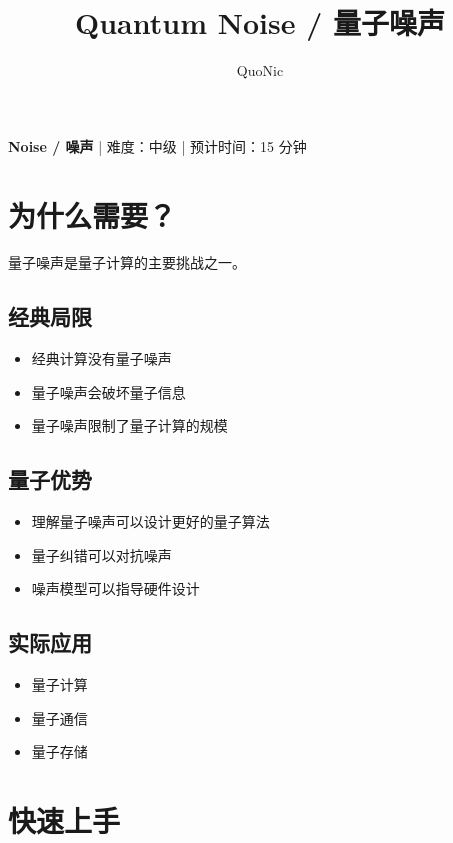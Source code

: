 \documentclass[12pt,a4paper]{article}
\title{Quantum Noise / 量子噪声}
\author{QuoNic}
\date{}
\begin{document}
\maketitle

\begin{center}
\textbf{Noise / 噪声} | 难度：中级 | 预计时间：15 分钟
\end{center}

\tableofcontents
\newpage

\section{为什么需要？}

量子噪声是量子计算的主要挑战之一。

\subsection{经典局限}
\begin{itemize}
  \item 经典计算没有量子噪声
  \item 量子噪声会破坏量子信息
  \item 量子噪声限制了量子计算的规模
\end{itemize}

\subsection{量子优势}
\begin{itemize}
  \item 理解量子噪声可以设计更好的量子算法
  \item 量子纠错可以对抗噪声
  \item 噪声模型可以指导硬件设计
\end{itemize}

\subsection{实际应用}
\begin{itemize}
  \item 量子计算
  \item 量子通信
  \item 量子存储
\end{itemize}

\section{快速上手}
\end{document}
